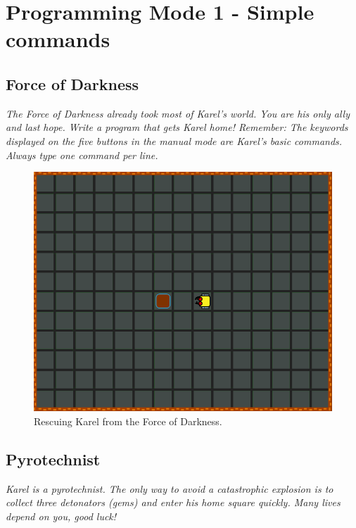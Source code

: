 
\section{Programming Mode 1 - Simple commands}

\subsection{Force of Darkness}

{\em The Force of Darkness already took most of Karel's world. You are his only ally and last hope. Write a program that gets Karel home! Remember: The keywords displayed on the five buttons in the manual mode are Karel's basic commands. Always type one command per line.}\\[-8mm]

\begin{figure}[!ht]
\begin{center}
\includegraphics[height=0.4\textwidth]{img/b01.png}
\end{center}
\vspace{-4mm}
\caption{Rescuing Karel from the Force of Darkness.}
\label{fig:b01}
\vspace{-9mm}
\end{figure}
\noindent

\subsection{Pyrotechnist}

{\em Karel is a pyrotechnist. The only way to avoid a catastrophic explosion is to collect three detonators (gems) and enter his home square quickly. Many lives depend on you, good luck!}\\[-8mm]

